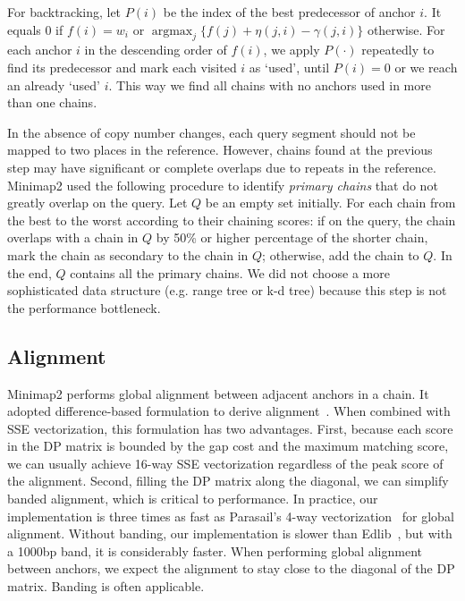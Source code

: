 \documentclass{bioinfo}
\DeclareMathOperator*{\argmax}{argmax}
\begin{document}
\begin{methods}
For backtracking, let $P(i)$ be the index of the best predecessor of anchor
$i$. It equals 0 if $f(i)=w_i$ or $\argmax_j\{f(j)+\eta(j,i)-\gamma(j,i)\}$
otherwise. For each anchor $i$ in the descending order of $f(i)$, we apply
$P(\cdot)$ repeatedly to find its predecessor and mark each visited $i$ as
`used', until $P(i)=0$ or we reach an already `used' $i$. This way we find all
chains with no anchors used in more than one chains.

In the absence of copy number changes, each query segment should not be mapped
to two places in the reference. However, chains found at the previous step may
have significant or complete overlaps due to repeats in the reference.
Minimap2 used the following procedure to identify \emph{primary chains} that do
not greatly overlap on the query. Let $Q$ be an empty set initially. For each
chain from the best to the worst according to their chaining scores: if on the
query, the chain overlaps with a chain in $Q$ by 50\% or higher percentage of
the shorter chain, mark the chain as secondary to the chain in $Q$; otherwise,
add the chain to $Q$. In the end, $Q$ contains all the primary chains. We did
not choose a more sophisticated data structure (e.g. range tree or k-d tree)
because this step is not the performance bottleneck.

\subsection{Alignment}

Minimap2 performs global alignment between adjacent anchors in a chain. It
adopted difference-based formulation to derive
alignment~\citep{Wu:1996aa,Suzuki:2016}. When combined with SSE vectorization,
this formulation has two advantages. First, because each score in the DP matrix
is bounded by the gap cost and the maximum matching score, we can usually
achieve 16-way SSE vectorization regardless of the peak score of the
alignment. Second, filling the DP matrix along the diagonal, we can simplify
banded alignment, which is critical to performance. In practice, our
implementation is three times as fast as Parasail's 4-way
vectorization~\citep{Daily:2016aa} for global alignment.
Without banding, our implementation is slower than Edlib~\citep{Sosic:2017aa},
but with a 1000bp band, it is considerably faster. When performing global
alignment between anchors, we expect the alignment to stay close to the
diagonal of the DP matrix. Banding is often applicable.


\end{methods}
\end{document}
